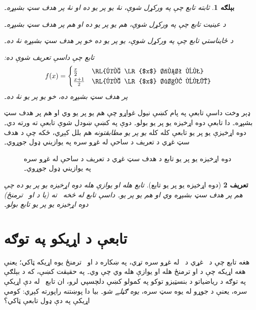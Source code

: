 \documentclass[12pt,a4paper,oneside]{report}
\newcommand{\Nat}{\mathbb{N}}
\newcommand{\olfileid}[3]{\gdef\pspart{#1}\gdef\pschapter{#2}\gdef\pssection{#3}}
\newcommand{\olsection}[1]{\section{#1}\label{\pspart:\pschapter:\pssection:sec}}
\newcommand{\ollabel}[1]{\label{\pspart:\pschapter:\pssection:#1}}
\newlength{\olphotowidth}
\newcommand{\olasset}[2][\olphotowidth]{\centering\begin{LTR}\centering\resizebox{#1}{!}{}\end{LTR}}
\newenvironment{explain}{}{}
\newtheorem{defn}{تعريف}[section]
\newtheorem{ex}[defn]{بېلګه}
\begin{document}
\begin{ex}
ثابته تابع \LR{$f\colon \Nat \to \Nat$} چې په  ورکړل شوې،
نۀ يو پر يو ده او نۀ پر هدف سټ بشپړه۔

د عينيت تابع \LR{$f\colon \Nat \to \Nat$} چې په  ورکړل شوې،
هم يو پر يو ده او هم پر هدف سټ بشپړه۔

د ځايناستي تابع \LR{$f \colon \Nat \to \Nat$} چې په  ورکړل
شوې، يو پر يو ده خو پر هدف سټ بشپړه نۀ ده۔
  
تابع \LR{$f \colon \Nat \to \Nat$} چې داسې تعريف شوې ده:
\[
  f(x) =
  \begin{cases}
    \frac{x}{2} & \text{\RL{که \LR{$x$} جفت وي}} \\
    \frac{x+1}{2} & \text{\RL{که \LR{$x$} طاق وي۔}}
  \end{cases}
\]
پر هدف سټ بشپړه ده، خو يو پر يو نۀ ده۔
\end{ex}

\begin{explain}
ډېر وخت داسې تابعې په پام کښې نيول غواړو چې هم يو پر يو وي
او هم پر هدف سټ بشپړه۔ دا تابعې دوه اړخيزه يو پر يو بولو۔ دوې په
 کښې ښودل شوې تابعې ته ورته دي۔ دوه اړخيزې يو پر يو تابعې
کله کله \emph{يو پر يو مطابقتونه} هم بلل کېږي، ځکه چې د هدف سټ
غړي د تعريف د ساحې له غړو سره په يوازيني ډول جوړوي۔
\begin{figure}
  \olasset{assets/diagrams/bijective.tikz}
  \caption{دوه اړخيزه يو پر يو تابع د هدف سټ غړي د تعريف د ساحې له غړو سره په يوازيني ډول جوړوي۔}
  \ollabel{fig:bijective}
\end{figure}
\end{explain}

\begin{defn}[دوه اړخيزه يو پر يو تابع]
تابع  هله او يوازې هله \emph{دوه اړخيزه يو پر يو} ده چې
هم پر هدف سټ بشپړه وي او هم يو پر يو۔ داسې تابع له  څخه~
ته (يا د  او~ ترمنځ) دوه اړخيزه يو پر يو تابع بولو۔
\end{defn}




\olfileid{sfr}{fun}{rel}

\olsection{تابعې د اړيکو په توګه}

\begin{explain}
هغه تابع چې د~ غړي د~ له غړو سره
تړي، په ښکاره د  او~ ترمنځ يوه اړيکه ټاکي؛ يعنې هغه اړيکه
چې د  او  ترمنځ هله او يوازې هله وي چې  وي۔
په حقيقت کښې، که د بېلګې په توګه د رياضياتو د بنسټيزو توکو
په کمولو کښې دلچسپي لرو، ان تابع~ له دې اړيکې سره، يعنې
د جوړو له يوه سټ سره، \emph{يوه ګڼلے} شو۔ بيا دا پوښتنه راپورته
کېږي: کومې اړيکې په دې ډول تابعې ټاکي؟
\end{explain}
\end{document}
